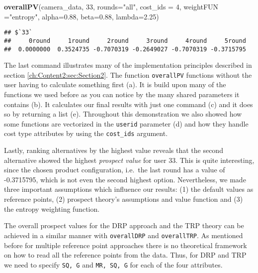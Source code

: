 \documentclass[]{article}
\newenvironment{Shaded}{\begin{snugshade}}{\end{snugshade}}
\newcommand{\KeywordTok}[1]{\textcolor[rgb]{0.13,0.29,0.53}{\textbf{{#1}}}}
\newcommand{\DataTypeTok}[1]{\textcolor[rgb]{0.13,0.29,0.53}{{#1}}}
\newcommand{\DecValTok}[1]{\textcolor[rgb]{0.00,0.00,0.81}{{#1}}}
\newcommand{\FloatTok}[1]{\textcolor[rgb]{0.00,0.00,0.81}{{#1}}}
\newcommand{\StringTok}[1]{\textcolor[rgb]{0.31,0.60,0.02}{{#1}}}
\newcommand{\NormalTok}[1]{{#1}}
\begin{document}
\begin{Shaded}
\begin{Highlighting}[]
\KeywordTok{overallPV}\NormalTok{(camera_data, }\DecValTok{33}\NormalTok{, }\DataTypeTok{rounds=}\StringTok{"all"}\NormalTok{, }\DataTypeTok{cost_ids =} \DecValTok{4}\NormalTok{, }\DataTypeTok{weightFUN =}\StringTok{"entropy"}\NormalTok{,}
          \DataTypeTok{alpha=}\FloatTok{0.88}\NormalTok{, }\DataTypeTok{beta=}\FloatTok{0.88}\NormalTok{, }\DataTypeTok{lambda=}\FloatTok{2.25}\NormalTok{)}
\end{Highlighting}
\end{Shaded}

\begin{verbatim}
## $`33`
##     0round     1round     2round     3round     4round     5round 
##  0.0000000  0.3524735 -0.7070319 -0.2649027 -0.7070319 -0.3715795
\end{verbatim}

The last command illustrates many of the implementation principles
described in section \ref{ch:Content2:sec:Section2}. The function
\texttt{overallPV} functions without the user having to calculate
something first (a). It is build upon many of the functions we used
before as you can notice by the many shared parameters it contains (b).
It calculates our final results with just one command (c) and it does so
by returning a list (e). Throughout this demonstration we also showed
how some functions are vectorized in the \texttt{userid} parameter (d)
and how they handle cost type attributes by using the \texttt{cost\_ids}
argument.

Lastly, ranking alternatives by the highest value reveals that the
second alternative showed the highest \emph{prospect value} for user 33.
This is quite interesting, since the chosen product configuration,
i.e.~the last round has a value of -0.3715795, which is not even the
second highest option. Nevertheless, we made three important assumptions
which influence our results: (1) the default values as reference points,
(2) prospect theory's assumptions and value function and (3) the entropy
weighting function.

The overall prospect values for the DRP approach and the TRP theory can
be achieved in a similar manner with \texttt{overallDRP} and
\texttt{overallTRP}. As mentioned before for multiple reference point
approaches there is no theoretical framework on how to read all the
reference points from the data. Thus, for DRP and TRP we need to specify
\texttt{SQ, G} and \texttt{MR, SQ, G} for each of the four attributes.
\end{document}
